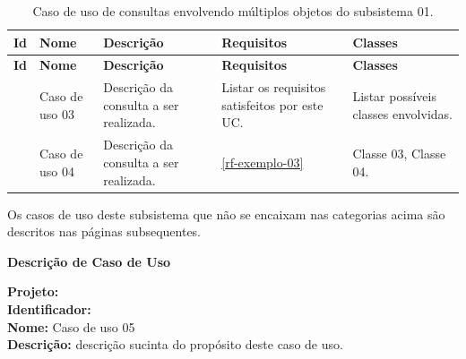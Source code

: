 \begin{longtable}{|c|p{2.5cm}|p{6cm}|p{2.2cm}|p{2cm}|}
	\caption{Caso de uso de consultas envolvendo múltiplos objetos do subsistema 01.}
	\label{tbl-casos-de-uso-subsistema-01-consultas} \\\hline 
	
	\rowcolor{lightgray}
	\textbf{Id} & \textbf{Nome} &  \textbf{Descrição} & \textbf{Requisitos} & \textbf{Classes} \\\hline	
	\endfirsthead
	\hline
	\rowcolor{lightgray}
	\textbf{Id} & \textbf{Nome} &  \textbf{Descrição} & \textbf{Requisitos} & \textbf{Classes} \\\hline	
	\endhead
	
	\UC\label{uc-subsistema-01-exemplo-03} & Caso de uso 03 & Descrição da consulta a ser realizada. & Listar os requisitos satisfeitos por este UC. & Listar possíveis classes envolvidas. \\\hline
	
	\UC\label{uc-subsistema-01-exemplo-04} & Caso de uso 04 & Descrição da consulta a ser realizada. & \ref{rf-exemplo-03} & Classe 03, Classe 04. \\\hline
\end{longtable}

Os casos de uso deste subsistema que não se encaixam nas categorias acima são descritos nas páginas subsequentes.


\clearpage
\begin{center}\textbf{Descrição de Caso de Uso}\end{center}

\noindent\textbf{Projeto:} \imprimirtitulo \\
\textbf{Identificador:} \UC\label{uc-subsistema-01-exemplo-05} \\
\textbf{Nome:} Caso de uso 05 \\
\textbf{Descrição:} descrição sucinta do propósito deste caso de uso.\\


